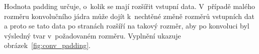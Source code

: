 Hodnota padding určuje, o~kolik se mají rozšířit vstupní data. V~případě malého rozměru konvolučního jádra může dojít k~nechtěné změně rozměrů vstupních dat a proto se tato data po stranách rozšíří na takový rozměr, aby po konvoluci byl výsledný tvar v~požadovaném rozměru. Vyplnění ukazuje obrázek~\ref{fig:conv_padding}.


%

